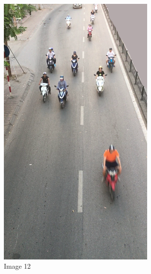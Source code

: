 \begin{center}
    \begin{figure}[H]
        \centering
      \includegraphics[width=0.7\textwidth]{Chapters/Fig/12}
      \caption{Image 12}
      \label{fig:img12}
  \end{figure}
\end{center}

